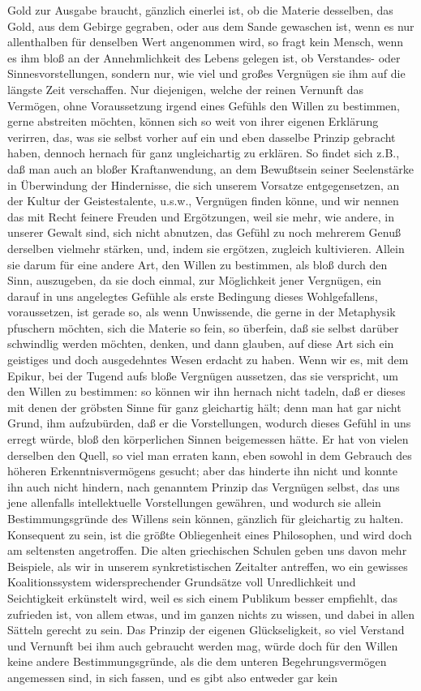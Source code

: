 \documentclass[a4paper,12pt,twoside]{book}
\begin{document}
Gold zur Ausgabe  braucht, gänzlich einerlei ist, ob die Materie desselben, das Gold, aus dem Gebirge gegraben, oder aus dem Sande gewaschen ist, wenn es nur allenthalben für denselben Wert angenommen wird, so fragt kein Mensch, wenn es ihm bloß an der Annehmlichkeit des Lebens gelegen ist, ob Verstandes- oder Sinnesvorstellungen, sondern nur, wie viel und großes Vergnügen sie ihm auf die längste Zeit verschaffen. Nur diejenigen, welche der reinen Vernunft das Vermögen, ohne Voraussetzung irgend eines Gefühls den Willen zu bestimmen, gerne abstreiten möchten, können sich so weit von ihrer eigenen Erklärung verirren, das, was sie selbst vorher auf ein und eben dasselbe Prinzip gebracht haben, dennoch hernach für ganz ungleichartig zu erklären. So findet sich z.B., daß man auch an bloßer Kraftanwendung, an dem Bewußtsein seiner Seelenstärke in Überwindung der Hindernisse, die sich unserem Vorsatze entgegensetzen, an der Kultur der Geistestalente, u.s.w., Vergnügen finden könne, und wir nennen das mit Recht feinere Freuden und Ergötzungen, weil sie mehr, wie andere, in unserer Gewalt sind, sich nicht abnutzen, das Gefühl zu noch mehrerem Genuß derselben vielmehr stärken, und, indem sie ergötzen, zugleich kultivieren. Allein sie darum für eine andere Art, den Willen zu bestimmen, als bloß durch den Sinn, auszugeben, da sie doch einmal, zur Möglichkeit jener Vergnügen, ein darauf in uns angelegtes Gefühle als erste Bedingung dieses Wohlgefallens, voraussetzen, ist gerade so, als wenn Unwissende, die gerne in der Metaphysik pfuschern möchten, sich die Materie so fein, so überfein, daß sie selbst darüber schwindlig werden möchten, denken, und dann glauben, auf diese Art sich ein geistiges und doch ausgedehntes Wesen erdacht zu haben. Wenn wir es, mit dem Epikur, bei der Tugend aufs bloße Vergnügen aussetzen, das sie verspricht, um den Willen zu bestimmen: so können wir ihn hernach nicht tadeln, daß er dieses mit denen der gröbsten Sinne für ganz gleichartig hält; denn man hat gar nicht Grund, ihm aufzubürden, daß er die Vorstellungen, wodurch dieses Gefühl in uns erregt würde, bloß den körperlichen Sinnen beigemessen hätte. Er hat von vielen derselben  den Quell, so viel man erraten kann, eben sowohl in dem Gebrauch des höheren Erkenntnisvermögens gesucht; aber das hinderte ihn nicht und konnte ihn auch nicht hindern, nach genanntem Prinzip das Vergnügen selbst, das uns jene allenfalls intellektuelle Vorstellungen gewähren, und wodurch sie allein Bestimmungsgründe des Willens sein können, gänzlich für gleichartig zu halten. Konsequent zu sein, ist die größte Obliegenheit eines Philosophen, und wird doch am seltensten angetroffen. Die alten griechischen Schulen geben uns davon mehr Beispiele, als wir in unserem synkretistischen Zeitalter antreffen, wo ein gewisses Koalitionssystem widersprechender Grundsätze voll Unredlichkeit und Seichtigkeit erkünstelt wird, weil es sich einem Publikum besser empfiehlt, das zufrieden ist, von allem etwas, und im ganzen nichts zu wissen, und dabei in allen Sätteln gerecht zu sein. Das Prinzip der eigenen Glückseligkeit, so viel Verstand und Vernunft bei ihm auch gebraucht werden mag, würde doch für den Willen keine andere Bestimmungsgründe, als die dem unteren Begehrungsvermögen angemessen sind, in sich fassen, und es gibt also entweder gar kein 
\end{document}
